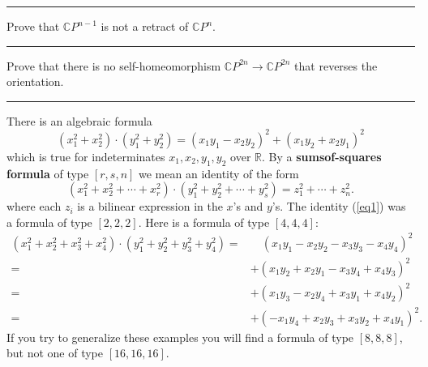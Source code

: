 \documentclass[letterpaper, 12pt]{article}
\begin{document}
\noindent\rule{7in}{2.8pt}
\begin{problem}{3}
Prove that \(\mathbb{C}P^{n-1}\) is not a retract of \(\mathbb{C}P^n\).
\end{problem}
\begin{solution}

\end{solution}

\noindent\rule{7in}{2.8pt}
\begin{problem}{4}
Prove that there is no self-homeomorphism \(\mathbb{C}P^{2n}\rightarrow \mathbb{C}P^{2n}\) that reverses the orientation. 
\end{problem}
\begin{solution}

\end{solution}

\noindent\rule{7in}{2.8pt}
There is an algebraic formula 
\begin{equation}\label{eq1}
    (x_1^2+x_2^2)\cdot (y_1^2+y_2^2)=(x_1y_1-x_2y_2)^2+(x_1y_2+x_2y_1)^2
\end{equation}
which is true for indeterminates \(x_1,x_2,y_1,y_2\) over \(\mathbb{R}\). By a \textbf{sumsof-squares formula} of type \([r,s,n]\) we mean an identity of the form 
\[(x_1^2+x_2^2+\cdots+x_r^2)\cdot (y_1^2+y_2^2+\cdots+y_s^2)=z_1^2+\cdots+z_n^2.\]
where each \(z_i\) is a bilinear expression in the \(x\)'s and \(y\)'s. The identity (\ref{eq1}) was a formula of type \([2,2,2]\). Here is a formula of type \([4,4,4]\):
\begin{align*}
    (x_1^2+x_2^2+x_3^2+x_4^2)\cdot (y_1^2+y_2^2+y_3^2+y_4^2)=&\quad (x_1y_1-x_2y_2-x_3y_3-x_4y_4)^2\\ 
                                                            =&+(x_1y_2+x_2y_1-x_3y_4+x_4y_3)^2\\ 
                                                            =&+(x_1y_3-x_2y_4+x_3y_1+x_4y_2)^2\\ 
                                                            =&+(-x_1y_4+x_2y_3+x_3y_2+x_4y_1)^2.
\end{align*}
If you try to generalize these examples you will find a formula of type \([8,8,8]\), but not one of type \([16,16,16]\).
\end{document}
